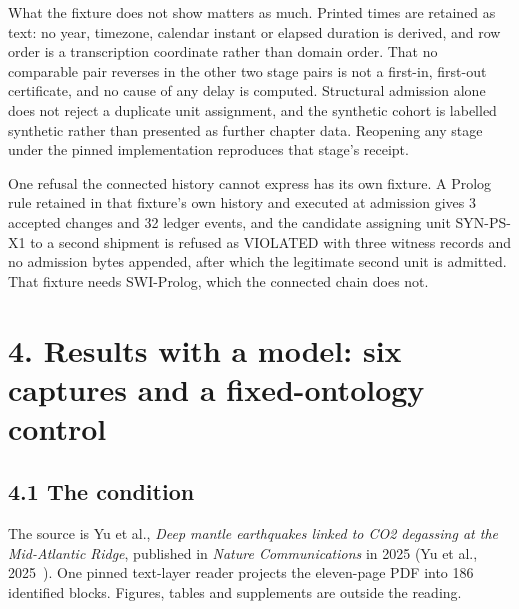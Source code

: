What the fixture does not show matters as much. Printed times are retained as text: no year, timezone, calendar instant or elapsed duration is derived, and row order is a transcription coordinate rather than domain order. That no comparable pair reverses in the other two stage pairs is not a first-in, first-out certificate, and no cause of any delay is computed. Structural admission alone does not reject a duplicate unit assignment, and the synthetic cohort is labelled synthetic rather than presented as further chapter data. Reopening any stage under the pinned implementation reproduces that stage's receipt.

One refusal the connected history cannot express has its own fixture. A Prolog rule retained in that fixture's own history and executed at admission gives 3 accepted changes and 32 ledger events, and the candidate assigning unit SYN-PS-X1 to a second shipment is refused as VIOLATED with three witness records and no admission bytes appended, after which the legitimate second unit is admitted. That fixture needs SWI-Prolog, which the connected chain does not.

\section*{4. Results with a model: six captures and a fixed-ontology control}

\subsection*{4.1 The condition}

The source is Yu et al., \emph{Deep mantle earthquakes linked to CO2 degassing at the Mid-Atlantic Ridge}, published in \emph{Nature Communications} in 2025 (Yu et al., 2025~\cite{yu2025deep}). One pinned text-layer reader projects the eleven-page PDF into 186 identified blocks. Figures, tables and supplements are outside the reading.

